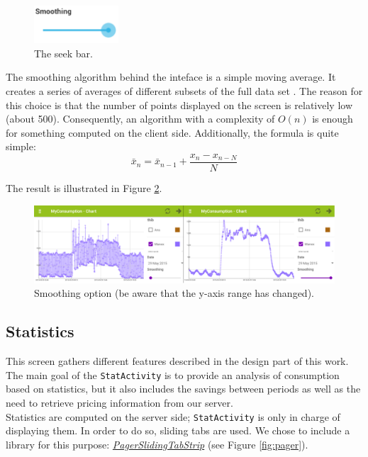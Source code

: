 \documentclass[a4paper, oneside, 11pt]{book}
\begin{document}
\begin{figure}[htbp]
	\centerline{\includegraphics[width=0.28\textwidth]{seekbar.png}}
	\caption{ The seek bar.}
	\label{fig:seekbar}
\end{figure}

The smoothing algorithm behind the inteface is a simple moving average. It creates a series of averages of different subsets of the full data set \cite{movingavverage:online}. The reason for this choice is that the number of points displayed on the screen is relatively low (about 500). Consequently, an algorithm with a complexity of \(O(n)\) is enough for something computed on the client side. Additionally, the formula is quite simple:
\[\bar{x}_n = \bar{x}_{n-1} + \frac{ x_n - x_{n-N} }{N}\]

The result is illustrated in Figure \ref{fig:chart_high_peaks_removed}.

\begin{figure}[htbp]
	\centerline{\includegraphics[width=1\textwidth]{chart_high_peaks_removed.png}}
	\caption{Smoothing option (be aware that the y-axis range has changed).}
	\label{fig:chart_high_peaks_removed}
\end{figure}

\subsection{Statistics}
This screen gathers different features described in the design part of this work. The main goal of the \texttt{StatActivity} is to provide an analysis of consumption based on statistics, but it also includes the savings between periods as well as the need to retrieve pricing information from our server.\\

Statistics are computed on the server side; \texttt{StatActivity} is only in charge of displaying them. In order to do so, sliding tabs are used. We chose to include a library for this purpose: \href{https://github.com/astuetz/PagerSlidingTabStrip}{\textit{PagerSlidingTabStrip}} (see Figure \ref{fig:pager}).
\end{document}
